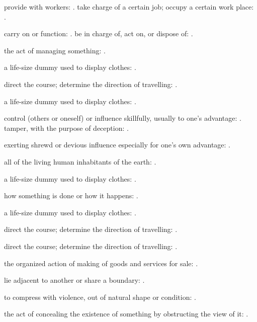   provide with workers: . take charge of a certain job; occupy a certain work place: .

  carry on or function: . be in charge of, act on, or dispose of: .

  the act of managing something: .

  a life-size dummy used to display clothes: .

  direct the course; determine the direction of travelling: .

  a life-size dummy used to display clothes: .

  control (others or oneself) or influence skillfully, usually to one's advantage: . tamper, with the purpose of deception: .

  exerting shrewd or devious influence especially for one's own advantage: .

  all of the living human inhabitants of the earth: .

  a life-size dummy used to display clothes: .

  how something is done or how it happens: .

  a life-size dummy used to display clothes: .

  direct the course; determine the direction of travelling: .

  direct the course; determine the direction of travelling: .

  the organized action of making of goods and services for sale: .

  lie adjacent to another or share a boundary: .

  to compress with violence, out of natural shape or condition: .

  the act of concealing the existence of something by obstructing the view of it: .

